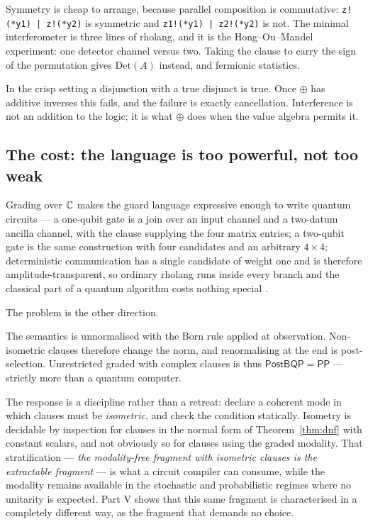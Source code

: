 Symmetry is cheap to arrange, because parallel composition is commutative:
\texttt{z!(*y1) | z!(*y2)} is symmetric and \texttt{z1!(*y1) | z2!(*y2)} is not.
The minimal interferometer is three lines of rholang, and it is the
Hong--Ou--Mandel experiment: one detector channel versus two. Taking the clause to
carry the sign of the permutation gives $\mathrm{Det}(A)$ instead, and fermionic
statistics.

\begin{principle}
\label{prin:falsedisj}
In the crisp setting a disjunction with a true disjunct is true. Once $\oplus$ has
additive inverses this fails, and the failure is exactly cancellation. Interference
is not an addition to the logic; it is what $\oplus$ does when the value algebra
permits it.
\end{principle}

\subsection{The cost: the language is too powerful, not too weak}

Grading over $\mathbb{C}$ makes the guard language expressive enough to write quantum
circuits --- a one-qubit gate is a join over an input channel and a two-datum
ancilla channel, with the clause supplying the four matrix entries; a two-qubit
gate is the same construction with four candidates and an arbitrary $4\times4$;
deterministic communication has a single candidate of weight one and is therefore
amplitude-transparent, so ordinary rholang runs inside every branch and the
classical part of a quantum algorithm costs nothing special \cite{GradedWhere}.

The problem is the other direction.

\begin{proposition}[Overshoot]
\label{prop:overshoot}
The semantics is unnormalised with the Born rule applied at observation.
Non-isometric clauses therefore change the norm, and renormalising at the end is
post-selection. Unrestricted graded \rhoc{} with complex clauses is thus
$\mathsf{PostBQP} = \mathsf{PP}$ \cite{Aaronson05} --- strictly more than a
quantum computer.
\end{proposition}

The response is a discipline rather than a retreat: declare a coherent mode in
which clauses must be \emph{isometric}, and check the condition statically.
Isometry is decidable by inspection for clauses in the normal form of
Theorem~\ref{thm:dnf} with constant scalars, and not obviously so for clauses
using the graded modality. That stratification --- \emph{the modality-free
fragment with isometric clauses is the extractable fragment} --- is what a circuit
compiler can consume, while the modality remains available in the stochastic and
probabilistic regimes where no unitarity is expected. Part V shows that this same
fragment is characterised in a completely different way, as the fragment that
demands no choice.

